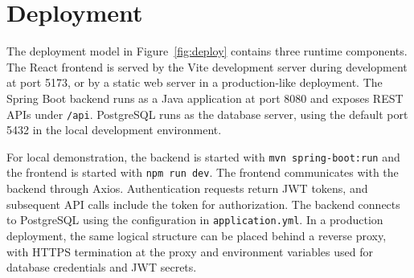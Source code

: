 \section{Deployment}
\label{sec:deployment}
The deployment model in Figure~\ref{fig:deploy} contains three runtime
components. The React frontend is served by the Vite development server during
development at port 5173, or by a static web server in a production-like
deployment. The Spring Boot backend runs as a Java application at port 8080 and
exposes REST APIs under \texttt{/api}. PostgreSQL runs as the database server,
using the default port 5432 in the local development environment.

For local demonstration, the backend is started with \texttt{mvn
spring-boot:run} and the frontend is started with \texttt{npm run dev}. The
frontend communicates with the backend through Axios. Authentication requests
return JWT tokens, and subsequent API calls include the token for authorization.
The backend connects to PostgreSQL using the configuration in
\texttt{application.yml}. In a production deployment, the same logical structure
can be placed behind a reverse proxy, with HTTPS termination at the proxy and
environment variables used for database credentials and JWT secrets.
